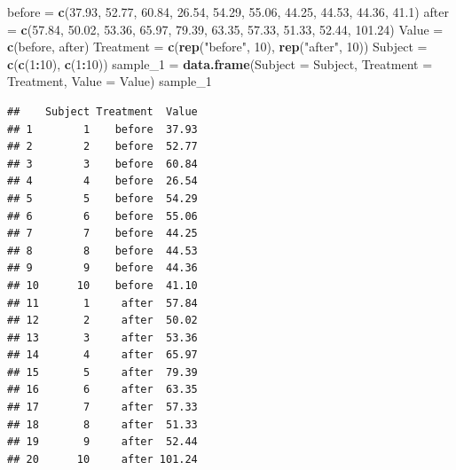 \documentclass[]{article}
\newenvironment{Shaded}{\begin{snugshade}}{\end{snugshade}}
\newcommand{\KeywordTok}[1]{\textcolor[rgb]{0.13,0.29,0.53}{\textbf{#1}}}
\newcommand{\DataTypeTok}[1]{\textcolor[rgb]{0.13,0.29,0.53}{#1}}
\newcommand{\DecValTok}[1]{\textcolor[rgb]{0.00,0.00,0.81}{#1}}
\newcommand{\FloatTok}[1]{\textcolor[rgb]{0.00,0.00,0.81}{#1}}
\newcommand{\StringTok}[1]{\textcolor[rgb]{0.31,0.60,0.02}{#1}}
\newcommand{\OperatorTok}[1]{\textcolor[rgb]{0.81,0.36,0.00}{\textbf{#1}}}
\newcommand{\NormalTok}[1]{#1}
\begin{document}
\begin{Shaded}
\begin{Highlighting}[]
\NormalTok{before =}\StringTok{ }\KeywordTok{c}\NormalTok{(}\FloatTok{37.93}\NormalTok{, }\FloatTok{52.77}\NormalTok{, }\FloatTok{60.84}\NormalTok{, }\FloatTok{26.54}\NormalTok{, }\FloatTok{54.29}\NormalTok{, }\FloatTok{55.06}\NormalTok{, }\FloatTok{44.25}\NormalTok{, }\FloatTok{44.53}\NormalTok{, }\FloatTok{44.36}\NormalTok{, }\FloatTok{41.1}\NormalTok{)}
\NormalTok{after =}\StringTok{ }\KeywordTok{c}\NormalTok{(}\FloatTok{57.84}\NormalTok{, }\FloatTok{50.02}\NormalTok{, }\FloatTok{53.36}\NormalTok{, }\FloatTok{65.97}\NormalTok{, }\FloatTok{79.39}\NormalTok{, }\FloatTok{63.35}\NormalTok{, }\FloatTok{57.33}\NormalTok{, }\FloatTok{51.33}\NormalTok{, }\FloatTok{52.44}\NormalTok{, }\FloatTok{101.24}\NormalTok{)}
\NormalTok{Value =}\StringTok{ }\KeywordTok{c}\NormalTok{(before, after)}
\NormalTok{Treatment =}\StringTok{ }\KeywordTok{c}\NormalTok{(}\KeywordTok{rep}\NormalTok{(}\StringTok{"before"}\NormalTok{, }\DecValTok{10}\NormalTok{), }\KeywordTok{rep}\NormalTok{(}\StringTok{"after"}\NormalTok{, }\DecValTok{10}\NormalTok{))}
\NormalTok{Subject =}\StringTok{ }\KeywordTok{c}\NormalTok{(}\KeywordTok{c}\NormalTok{(}\DecValTok{1}\OperatorTok{:}\DecValTok{10}\NormalTok{), }\KeywordTok{c}\NormalTok{(}\DecValTok{1}\OperatorTok{:}\DecValTok{10}\NormalTok{))}
\NormalTok{sample_}\DecValTok{1}\NormalTok{ =}\StringTok{ }\KeywordTok{data.frame}\NormalTok{(}\DataTypeTok{Subject =}\NormalTok{ Subject, }\DataTypeTok{Treatment =}\NormalTok{ Treatment, }\DataTypeTok{Value =}\NormalTok{ Value)}
\NormalTok{sample_}\DecValTok{1}
\end{Highlighting}
\end{Shaded}

\begin{verbatim}
##    Subject Treatment  Value
## 1        1    before  37.93
## 2        2    before  52.77
## 3        3    before  60.84
## 4        4    before  26.54
## 5        5    before  54.29
## 6        6    before  55.06
## 7        7    before  44.25
## 8        8    before  44.53
## 9        9    before  44.36
## 10      10    before  41.10
## 11       1     after  57.84
## 12       2     after  50.02
## 13       3     after  53.36
## 14       4     after  65.97
## 15       5     after  79.39
## 16       6     after  63.35
## 17       7     after  57.33
## 18       8     after  51.33
## 19       9     after  52.44
## 20      10     after 101.24
\end{verbatim}
\end{document}
